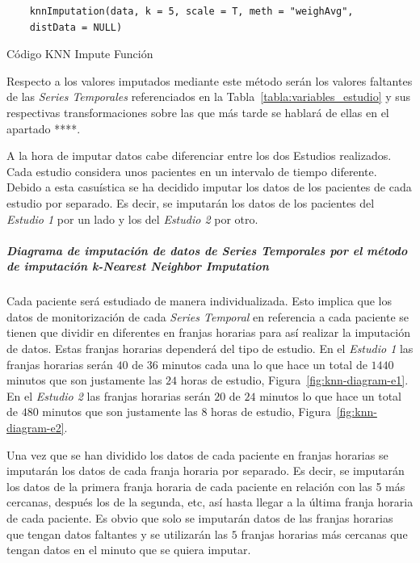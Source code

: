 \begin{code}[H]
\begin{lstlisting}
    knnImputation(data, k = 5, scale = T, meth = "weighAvg",
    distData = NULL)
\end{lstlisting}
\caption{Código KNN Impute Función}
\label{cod:snipet-knn-impute}
\end{code}

Respecto a los valores imputados mediante este método serán los valores faltantes de las \textit{Series Temporales} referenciados en la Tabla~\ref{tabla:variables_estudio} y sus respectivas transformaciones sobre las que más tarde se hablará de ellas en el apartado ****. 

A la hora de imputar datos cabe diferenciar entre los dos Estudios realizados. Cada estudio considera unos pacientes en un intervalo de tiempo diferente. Debido a esta casuística se ha decidido imputar los datos de los pacientes de cada estudio por separado. Es decir, se imputarán los datos de los pacientes del \textit{Estudio 1} por un lado y los del \textit{Estudio 2} por otro.

\subparagraph*{Diagrama de imputación de datos de \textit{Series Temporales} por el método de imputación \textit{k-Nearest Neighbor Imputation}}\label{sec:diagrama-imputacion-knn}

Cada paciente será estudiado de manera individualizada. Esto implica que los datos de monitorización de cada \textit{Series Temporal} en referencia a cada paciente se tienen que dividir en diferentes en franjas horarias para así realizar la imputación de datos. Estas franjas horarias dependerá del tipo de estudio. En el \textit{Estudio 1} las franjas horarias serán $40$ de $36$ minutos cada una lo que hace un total de $1440$ minutos que son justamente las $24$ horas de estudio, Figura~\ref{fig:knn-diagram-e1}. En el \textit{Estudio 2} las franjas horarias serán $20$ de $24$ minutos lo que hace un total de $480$ minutos que son justamente las $8$ horas de estudio, Figura~\ref{fig:knn-diagram-e2}.

Una vez que se han dividido los datos de cada paciente en franjas horarias se imputarán los datos de cada franja horaria por separado. Es decir, se imputarán los datos de la primera franja horaria de cada paciente en relación con las 5 más cercanas, después los de la segunda, etc, así hasta llegar a la última franja horaria de cada paciente. Es obvio que solo se imputarán datos de las franjas horarias que tengan datos faltantes y se utilizarán las $5$ franjas horarias más cercanas que tengan datos en el minuto que se quiera imputar.

